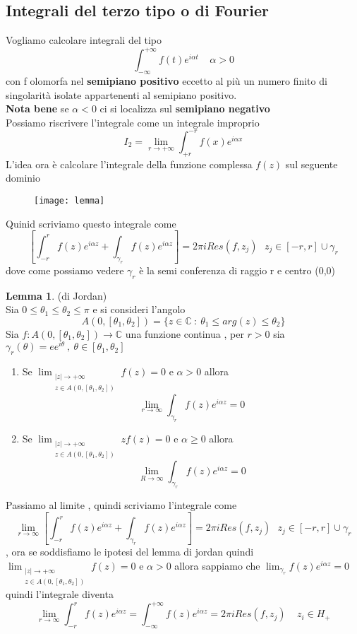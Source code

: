 \documentclass{article}
\theoremstyle{definition}
\newtheorem*{lemma}{Lemma}
\newcommand{\C}{\mathbb{C}}
\newcommand{\intinf}{\int_{-\infty}^{+\infty}}
\begin{document}
\subsection{Integrali del terzo tipo o di Fourier}
Vogliamo calcolare integrali del tipo 
$$\intinf f(t)e^{i \alpha t} \ \ \ \ \ \alpha >0$$ con f olomorfa nel \textbf{semipiano positivo} eccetto al più un numero finito di singolarità isolate appartenenti al semipiano positivo.\\ 
\textbf{Nota bene } se $\alpha <0$ ci si localizza sul \textbf{semipiano negativo }\\
Possiamo riscrivere l'integrale come un integrale improprio 
$$I_2=\lim_{r \rightarrow +\infty}\int_{+r}^{-r}f(x)e^{i\alpha x}$$
L'idea ora è calcolare l'integrale della funzione complessa $f(z)$ sul seguente dominio 
\begin{figure}[h]
	\centering
	\texttt{[image: lemma]}
\end{figure}
Quinid scriviamo questo integrale come 
$$\left[\int_{-r}^{r}f(z)e^{i\alpha z}+\int_{\gamma_r}f(z)e^{i\alpha z}\right]=2 \pi i Res(f,z_j) \ \ \ z_j \in [-r,r]\cup \gamma_r$$
dove come possiamo vedere $\gamma_r $ è la semi conferenza di raggio r e centro (0,0)
\begin{tcolorbox}
\begin{lemma}(di Jordan)\\
	Sia $0 \leq \theta_1\leq \theta_2\leq \pi$ e si consideri l'angolo 
	$$A(0,[\theta_1,\theta_2])=\{z\in\C \ :\ \theta_1\leq arg(z)\leq \theta_2\}$$
	Sia $f:A(0,[\theta_1,\theta_2])\rightarrow \C$ una funzione continua , per $r >0$ sia $\gamma_r(\theta)=ee^{i\theta} \ , \ \theta\in [\theta_1,\theta_2]$
	\begin{enumerate}
		\item Se $\lim_{\substack{|z| \to +\infty \\ z \in A(0, [\theta_1, \theta_2])}}f(z)=0$ e $\alpha>0$ allora 
		$$\lim_{r\rightarrow \infty} \int_{\gamma_r}f(z)e^{i\alpha z}=0$$
		\item Se  $\lim_{\substack{|z| \to +\infty \\ z \in A(0, [\theta_1, \theta_2])}}zf(z)=0$  e $\alpha \geq 0$ allora 
		$$\lim_{R\rightarrow \infty}\int_{\gamma_r}f(z)e^{i\alpha z}=0$$
	\end{enumerate}
\end{lemma}
\end{tcolorbox}
Passiamo al limite , quindi scriviamo l'integrale come 
$$\lim_{r\rightarrow \infty}\left[\int_{-r}^{r}f(z)e^{i\alpha z}+\int_{\gamma_r}f(z)e^{i\alpha z}\right]=2 \pi i Res(f,z_j) \ \ \ z_j \in [-r,r]\cup \gamma_r$$ , ora se soddisfiamo le ipotesi del lemma di jordan quindi  $\lim_{\substack{|z| \to +\infty \\ z \in A(0, [\theta_1, \theta_2])}}f(z)=0$ e $\alpha>0$ allora sappiamo che $\lim_{\gamma_r}f(z)e^{i\alpha z}=0$  quindi l'integrale diventa
$$\lim_{r\rightarrow \infty }\int_{-r}^{r}f(z)e^{i\alpha z}=\intinf f(z)e^{i \alpha z}=2\pi i Res(f,z_j)\ \ \ \ \  z_i \in H_+$$
\end{document}

